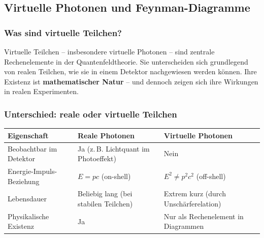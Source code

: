 \subsection{Virtuelle Photonen und Feynman-Diagramme}

\subsubsection{Was sind virtuelle Teilchen?}

Virtuelle Teilchen – insbesondere virtuelle Photonen – sind zentrale Rechenelemente in der Quantenfeldtheorie.
Sie unterscheiden sich grundlegend von realen Teilchen, wie sie in einem Detektor nachgewiesen werden können.
Ihre Existenz ist \textbf{mathematischer Natur} – und dennoch zeigen sich ihre Wirkungen in realen Experimenten.

\subsubsection*{Unterschied: reale  oder virtuelle Teilchen}
\begin{table}[H]
	\centering
	\scriptsize 

{\small
	\begin{center}
		\renewcommand{\arraystretch}{1.3}
		\begin{tabular}{|p{3cm}|p{3.0cm}|p{3.0cm}|}
			\hline
			\textbf{Eigenschaft} & \textbf{Reale Photonen} & \textbf{Virtuelle Photonen} \\
			\hline
			Beobachtbar im Detektor & Ja (z.\,B. Lichtquant im Photoeffekt) & Nein \\
			\hline
			Energie-Impuls-Beziehung & $E = pc$ (on-shell) & $E^2 \ne p^2 c^2$ (off-shell) \\
			\hline
			Lebensdauer & Beliebig lang (bei stabilen Teilchen) & Extrem kurz (durch Unschärferelation) \\
			\hline
			Physikalische Existenz & Ja & Nur als Rechenelement in Diagrammen \\
			\hline
		\end{tabular}
	\end{center}
}
\end{table}
\medskip

